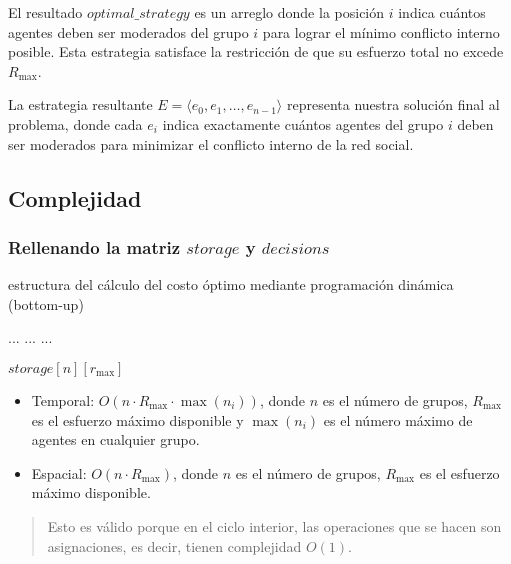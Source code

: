 El resultado $optimal\_strategy$ es un arreglo donde la posición $i$ indica cuántos agentes deben ser moderados del grupo $i$ para lograr el mínimo conflicto interno posible. Esta estrategia satisface la restricción de que su esfuerzo total no excede $R_{ \max }$.

La estrategia resultante $E = \langle e_0,e_1,\ldots,e_{ n - 1 } \rangle$ representa nuestra solución final al problema, donde cada $e_i$ indica exactamente cuántos agentes del grupo $i$ deben ser moderados para minimizar el conflicto interno de la red social.

\subsection{Complejidad}

\subsubsection{Rellenando la matriz $storage$ y $decisions$}

\begin{algorithm}[H]
	\caption{estructura del cálculo del costo óptimo mediante programación dinámica (bottom-up)}
	\begin{algorithmic}[1]
		\State ...
			\State ...
					\State ...
				\EndFor
			\EndFor
		\EndFor

		\State \Return $storage[n][r_{ \max }]$
	\end{algorithmic}
\end{algorithm}

\begin{itemize}
	\item Temporal: $O(n \cdot R_{ \max } \cdot \max(n_i))$, donde $n$ es el número de grupos, $R_{ \max }$ es el esfuerzo máximo disponible y $\max(n_i)$ es el número máximo de agentes en cualquier grupo.

	\item Espacial: $O(n \cdot R_{ \max })$, donde $n$ es el número de grupos, $R_{ \max }$ es el esfuerzo máximo disponible.
\end{itemize}

\begin{quote}
	Esto es válido porque en el ciclo interior, las operaciones que se hacen son asignaciones, es decir, tienen complejidad $O(1)$.
\end{quote}

